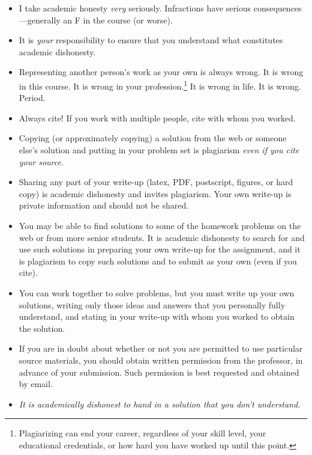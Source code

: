\documentclass[11pt]{article}
\begin{document}
\begin{itemize}[noitemsep]

\item I take academic honesty \emph{very} seriously.  Infractions have
  serious consequences---generally an F in the course (or worse).

\item It is \emph{your} responsibility to ensure that you understand
  what constitutes academic dishonesty.

\item Representing another person's work as your own is always wrong.
  It is wrong in this course. It is wrong in your
  profession.\footnote{Plagiarizing can end your career, regardless of
    your skill level, your educational credentials, or how hard you
    have worked up until this point. } It is wrong in life. It is
  wrong. Period.


\item Always cite! If you work with multiple people, cite with whom you worked.

\item Copying (or approximately copying) a solution from the web or
  someone else's solution and putting in your problem set is
  plagiarism \emph{even if you cite your source}.

\item Sharing any part of your write-up (latex, PDF, postscript,
  figures, or hard copy) is academic dishonesty and invites
  plagiarism.  Your own write-up is private information and should not
  be shared.

\item You may be able to find solutions to some of the homework
  problems on the web or from more senior students. It is academic
  dishonesty to search for and use such solutions in preparing your
  own write-up for the assignment, and it is plagiarism to copy such
  solutions and to submit as your own (even if you cite). 

\item You can work together to solve problems, but you must write up
  your own solutions, writing only those ideas and answers that you
  personally fully understand, and stating in your write-up with whom
  you worked to obtain the solution.

\item If you are in doubt about whether or not you are permitted to
  use particular source materials, you should obtain written
  permission from the professor, in advance of your submission. Such
  permission is best requested and obtained by email.

\item {\em It is academically dishonest to hand in a solution that you
    don't understand.}


\end{itemize}
 
\end{document}
